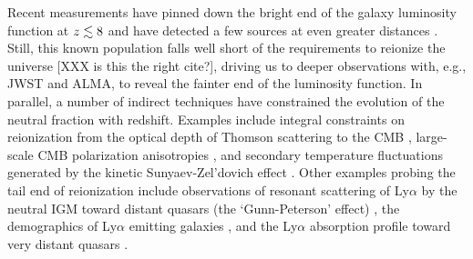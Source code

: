 \documentclass[twocolumn,numberedappendix]{emulateapj} \shorttitle{PSA64}
\begin{document}
Recent measurements
have pinned down the bright end of the galaxy luminosity function
at $z \lesssim 8$ \citep{bouwens_et_al2010,schenker_et_al2013} and have detected a few sources at even greater
distances \citep{ellis_et_al2013,oesch_et_al2013}. Still, this known population falls well short 
of the requirements to reionize the universe \citep{robertson_et_al2013} [XXX is this the right cite?], 
driving us to deeper observations with, e.g., JWST and ALMA, to reveal the fainter end of the luminosity function.
In parallel, a number of indirect techniques have constrained the evolution of the neutral fraction
with redshift. Examples include integral constraints on reionization from the
optical depth of Thomson scattering to the CMB \citep{planck_et_al2014},
large-scale CMB polarization anisotropies \citep{page_et_al2007}, and
secondary temperature fluctuations generated by the kinetic Sunyaev-Zel'dovich effect \citep{zahn_et_al2012,mesinger_et_al2012}.
Other examples probing the tail end of reionization include
observations of resonant scattering of Ly$\alpha$ by the neutral IGM toward
distant quasars (the `Gunn-Peterson' effect) \citep{fan_et_al2006},
the demographics of Ly$\alpha$ emitting galaxies \citep{schenker_et_al2013,treu_et_al2013,Faisst_et_al2014},
and the
Ly$\alpha$ absorption profile toward very distant quasars \citep{bolton_et_al2011}.

\end{document}
